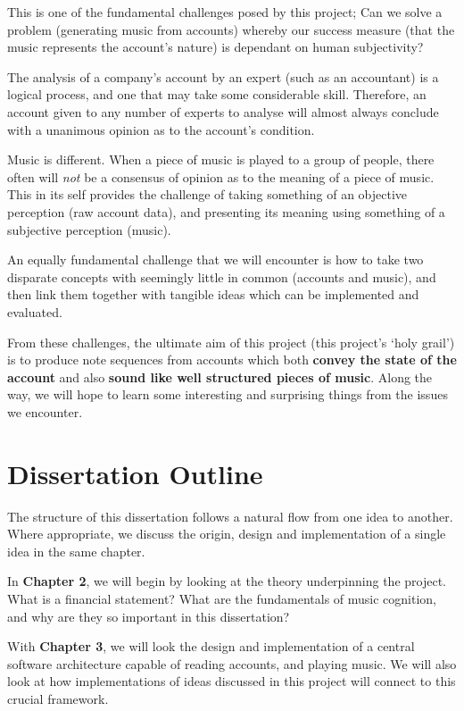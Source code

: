 This is one of the fundamental challenges posed by this project; Can we solve a problem (generating music from accounts) whereby our success measure (that the music represents the account's nature) is dependant on human subjectivity?

The analysis of a company's account by an expert (such as an accountant) is a logical process, and one that may take some considerable skill. Therefore, an account given to any number of experts to analyse will almost always conclude with a unanimous opinion as to the account's condition.

Music is different. When a piece of music is played to a group of people, there often will \textit{not} be a consensus of opinion as to the meaning of a piece of music. This in its self provides the challenge of taking something of an objective perception (raw account data), and presenting its meaning using something of a subjective perception (music).

An equally fundamental challenge that we will encounter is how to take two disparate concepts with seemingly little in common (accounts and music), and then link them together with tangible ideas which can be implemented and evaluated.

From these challenges, the ultimate aim of this project (this project's `holy grail') is to produce note sequences from accounts which both \textbf{convey the state of the account} and also \textbf{sound like well structured pieces of music}. Along the way, we will hope to learn some interesting and surprising things from the issues we encounter.

\section{Dissertation Outline}

The structure of this dissertation follows a natural flow from one idea to another. Where appropriate, we discuss the origin, design and implementation of a single idea in the same chapter.

In \textbf{Chapter 2}, we will begin by looking at the theory underpinning the project. What is a financial statement? What are the fundamentals of music cognition, and why are they so important in this dissertation?

With \textbf{Chapter 3}, we will look the design and implementation of a central software architecture capable of reading accounts, and playing music. We will also look at how implementations of ideas discussed in this project will connect to this crucial framework.

